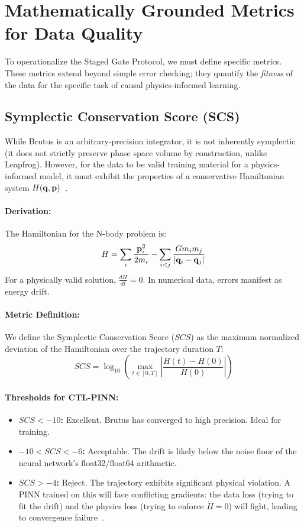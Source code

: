 \section{Mathematically Grounded Metrics for Data Quality}

To operationalize the Staged Gate Protocol, we must define specific metrics. These metrics extend beyond simple error checking; they quantify the \textit{fitness} of the data for the specific task of causal physics-informed learning.

\subsection{Symplectic Conservation Score (SCS)}

While Brutus is an arbitrary-precision integrator, it is not inherently symplectic (it does not strictly preserve phase space volume by construction, unlike Leapfrog). However, for the data to be valid training material for a physics-informed model, it must exhibit the properties of a conservative Hamiltonian system $H(\mathbf{q}, \mathbf{p})$~\cite{ref12}.

\paragraph{Derivation:}
The Hamiltonian for the N-body problem is:
\begin{equation}
    H = \sum_{i} \frac{\mathbf{p}_i^2}{2m_i} - \sum_{i < j} \frac{G m_i m_j}{|\mathbf{q}_i - \mathbf{q}_j|}
\end{equation}
For a physically valid solution, $\frac{dH}{dt} = 0$. In numerical data, errors manifest as energy drift.

\paragraph{Metric Definition:}
We define the Symplectic Conservation Score ($SCS$) as the maximum normalized deviation of the Hamiltonian over the trajectory duration $T$:
\begin{equation}
    SCS = \log_{10} \left( \max_{t \in [0, T]} \left| \frac{H(t) - H(0)}{H(0)} \right| \right)
\end{equation}

\paragraph{Thresholds for CTL-PINN:}
\begin{itemize}
    \item \textbf{$SCS < -10$:} Excellent. Brutus has converged to high precision. Ideal for training.
    \item \textbf{$-10 < SCS < -6$:} Acceptable. The drift is likely below the noise floor of the neural network's float32/float64 arithmetic.
    \item \textbf{$SCS > -4$:} Reject. The trajectory exhibits significant physical violation. A PINN trained on this will face conflicting gradients: the data loss (trying to fit the drift) and the physics loss (trying to enforce $\dot{H}=0$) will fight, leading to convergence failure~\cite{ref21}.
\end{itemize}

